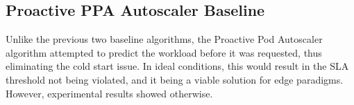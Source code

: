 \subsection {Proactive PPA Autoscaler Baseline}
\label{subsec:ch5-proactive-algo}

Unlike the previous two baseline algorithms, the Proactive Pod Autoscaler algorithm attempted to predict the workload before it was requested, thus eliminating the cold start issue. In ideal conditions, this would result in the SLA threshold not being violated, and it being a viable solution for edge paradigms. However, experimental results showed otherwise.\par

